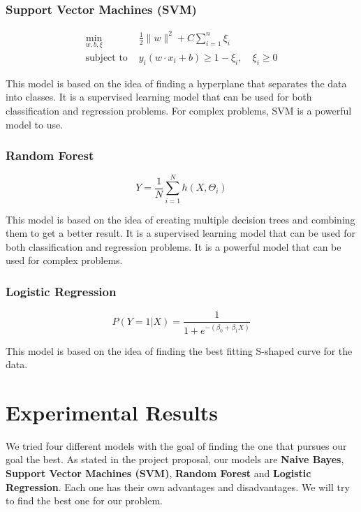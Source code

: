 \documentclass[conference]{IEEEtran}
\begin{document}
\subsubsection{Support Vector Machines (SVM)}

\begin{align*}
    \min_{w, b, \xi}\text{ } & \frac{1}{2} \| w \|^2 + C \sum_{i=1}^{n} \xi_i \\
    \text{subject to } & y_i (w \cdot x_i + b) \geq 1 - \xi_i, \quad \xi_i \geq 0
\end{align*}

This model is based on the idea of finding a hyperplane that separates the data into classes. It is a supervised learning model that can be used for both classification and regression problems. For complex problems, SVM is a powerful model to use.

\subsubsection{Random Forest}

\begin{equation*}
    Y = \frac{1}{N} \sum_{i=1}^{N} h(X, \Theta_i)
\end{equation*}

This model is based on the idea of creating multiple decision trees and combining them to get a better result. It is a supervised learning model that can be used for both classification and regression problems. It is a powerful model that can be used for complex problems.

\subsubsection{Logistic Regression}

\begin{equation*}
    P(Y=1|X) = \frac{1}{1 + e^{-(\beta_0 + \beta_1 X)}}
\end{equation*}

This model is based on the idea of finding the best fitting S-shaped curve for the data.

\section{Experimental Results}

We tried four different models with the goal of finding the one that pursues our goal the best. As stated in the project proposal, our models are \textbf{Naive Bayes}, \textbf{Support Vector Machines (SVM)}, \textbf{Random Forest} and \textbf{Logistic Regression}. Each one has their own advantages and disadvantages. We will try to find the best one for our problem.
\end{document}
